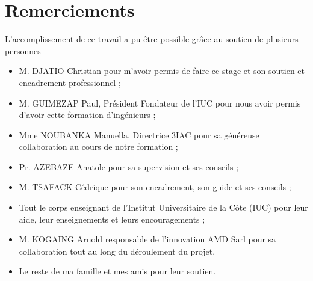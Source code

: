 \chapter*{Remerciements}%
%

L’accomplissement de ce travail a pu être possible grâce au soutien de plusieurs personnes
\begin{itemize}
    \item M. DJATIO Christian pour m’avoir permis de faire ce stage et son soutien et encadrement professionnel ;
    \item M. GUIMEZAP Paul, Président Fondateur de l'IUC pour nous avoir permis d’avoir cette formation d’ingénieurs ;
    \item Mme NOUBANKA Manuella, Directrice 3IAC pour sa généreuse collaboration au cours de notre formation ;
    \item Pr. AZEBAZE Anatole pour sa supervision et ses conseils ;
    \item M. TSAFACK Cédrique pour son encadrement, son guide et ses conseils ;
    \item Tout le corps enseignant de l'Institut Universitaire de la Côte (IUC) pour leur aide, leur enseignements et leurs encouragements ;
    \item M. KOGAING Arnold responsable de l'innovation AMD Sarl pour sa collaboration tout au long du déroulement du projet. 
    \item Le reste de ma famille et mes amis pour leur soutien.
\end{itemize}
